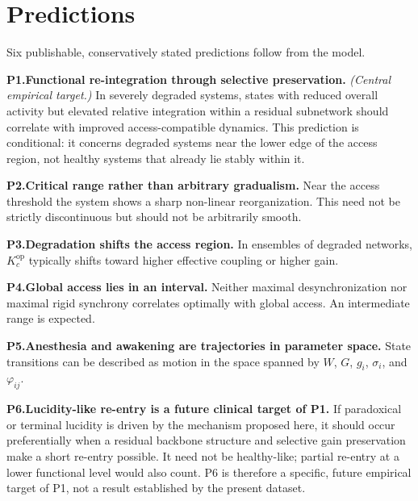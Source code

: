 \documentclass[11pt,a4paper]{article}
\theoremstyle{plain}
\theoremstyle{definition}
\theoremstyle{remark}
\newcommand{\Kcop}{K_c^{\mathrm{op}}}
\begin{document}
\section{Predictions}
\label{sec:predictions}
\label{sec:vorhersagen}

Six publishable, conservatively stated predictions follow from the model.

\medskip
\noindent\textbf{P1.\;Functional re-integration through selective preservation.} \emph{(Central empirical target.)}\quad
In severely degraded systems, states with reduced overall activity but elevated relative integration within a residual subnetwork should correlate with improved access-compatible dynamics. This prediction is conditional: it concerns degraded systems near the lower edge of the access region, not healthy systems that already lie stably within it.

\medskip
\noindent\textbf{P2.\;Critical range rather than arbitrary gradualism.}\quad
Near the access threshold the system shows a sharp non-linear reorganization. This need not be strictly discontinuous but should not be arbitrarily smooth.

\medskip
\noindent\textbf{P3.\;Degradation shifts the access region.}\quad
In ensembles of degraded networks, $\Kcop$ typically shifts toward higher effective coupling or higher gain.

\medskip
\noindent\textbf{P4.\;Global access lies in an interval.}\quad
Neither maximal desynchronization nor maximal rigid synchrony correlates optimally with global access. An intermediate range is expected.

\medskip
\noindent\textbf{P5.\;Anesthesia and awakening are trajectories in parameter space.}\quad
State transitions can be described as motion in the space spanned by $W$, $G$, $g_i$, $\sigma_i$, and $\varphi_{ij}$.

\medskip
\noindent\textbf{P6.\;Lucidity-like re-entry is a future clinical target of P1.}\quad
If paradoxical or terminal lucidity is driven by the mechanism proposed here, it should occur preferentially when a residual backbone structure and selective gain preservation make a short re-entry possible. It need not be healthy-like; partial re-entry at a lower functional level would also count. P6 is therefore a specific, future empirical target of P1, not a result established by the present dataset.


\end{document}

